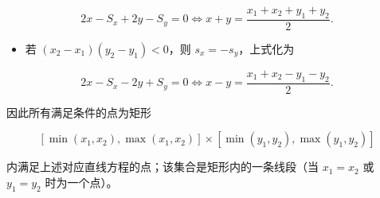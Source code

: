 \begin{answer}
\nopagebreak[4]
\[2x-S_x+2y-S_y=0
\iff x+y=\frac{x_1+x_2+y_1+y_2}{2}.\]

\begin{itemize}
\item 若 $(x_2-x_1)(y_2-y_1)<0$，则 $s_x=-s_y$，上式化为
\end{itemize}

\nopagebreak[4]
\[2x-S_x-2y+S_y=0
\iff x-y=\frac{x_1+x_2-y_1-y_2}{2}.\]

因此所有满足条件的点为矩形

\nopagebreak[4]
\[[\min(x_1,x_2),\max(x_1,x_2)]\times[\min(y_1,y_2),\max(y_1,y_2)]\]

内满足上述对应直线方程的点；该集合是矩形内的一条线段（当 $x_1=x_2$ 或 $y_1=y_2$ 时为一个点）。


\end{answer}